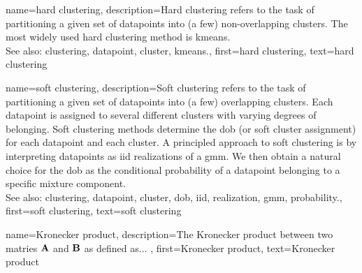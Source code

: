 
{name={hard clustering}, 
	description={Hard \gls{clustering} 
		refers to the task of partitioning a given set of \glspl{datapoint} into (a few) non-overlapping \glspl{cluster}. 
		The most widely used hard \gls{clustering} method is \gls{kmeans}.
				\\
		See also: \gls{clustering}, \gls{datapoint}, \gls{cluster}, \gls{kmeans}.},
	first={hard clustering},
	text={hard clustering} 
}
	
{name={soft clustering}, 
	description={Soft \gls{clustering} 
		refers to the task of partitioning a given set of \glspl{datapoint} into (a few) overlapping \glspl{cluster}. 
		Each \gls{datapoint} is assigned to several different \glspl{cluster} with varying degrees of belonging. Soft \gls{clustering} 
		methods determine the \gls{dob} (or soft \gls{cluster} assignment) for each \gls{datapoint} and each \gls{cluster}.
		A principled approach to soft \gls{clustering} is by interpreting \glspl{datapoint} as \gls{iid} \glspl{realization} 
		of a \gls{gmm}. We then obtain a natural choice for the \gls{dob} as the conditional 
		\gls{probability} of a \gls{datapoint} belonging to a specific mixture component.
				\\
		See also: \gls{clustering}, \gls{datapoint}, \gls{cluster}, \gls{dob}, \gls{iid}, \gls{realization}, \gls{gmm}, \gls{probability}.},
	first={soft clustering},
	text={soft clustering} 
}


{name={Kronecker product}, 
	description={The Kronecker product between two matries ${\bf A}$ and ${\bf B}$ as 
		defined as... 
		},
	first={Kronecker product},
	text={Kronecker product} 
}


